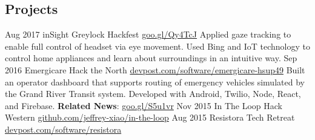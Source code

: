 \documentclass{resume}
\begin{document}
\begin{main}
    \section{Projects}
      \begin{entrylist}
        \rightentry%
          {Aug 2017}%
          {inSight}%
          {Greylock Hackfest}%
          {\href{https://goo.gl/Qy4TcJ}{goo.gl/Qy4TcJ}}%
          {%
          {%
            Applied gaze tracking to enable full control of headset via eye movement. %
          }%
          {%
            Used Bing and IoT technology to control home appliances and learn about surroundings %
            in an intuitive way. %
          }}
        \rightentry%
          {Sep 2016}%
          {Emergicare}%
          {Hack the North}%
          {\href{https://devpost.com/software/emergicare-hsup49}{devpost.com/software/emergicare-hsup49}}%
          {%
          {%
            Built an operator dashboard that supports routing of emergency vehicles simulated by %
            the Grand River Transit system. %
          }%
          {%
            Developed with Android, Twilio, Node, React, and Firebase. %
          }%
          {%
            \textbf{Related News}: \color{lightred}\href{https://goo.gl/S5u1vr}{goo.gl/S5u1vr}%
          }}
        \rightentry%
          {Nov 2015}%
          {In The Loop}%
          {Hack Western}%
          {\href{https://github.com/jeffrey-xiao/in-the-loop}{github.com/jeffrey-xiao/in-the-loop}}%
          {}
        \rightentry%
          {Aug 2015}%
          {Resistora}%
          {Tech Retreat}%
          {\href{https://devpost.com/software/resistora}{devpost.com/software/resistora}}%
          {}
      \end{entrylist}
  \end{main}
\end{document}
